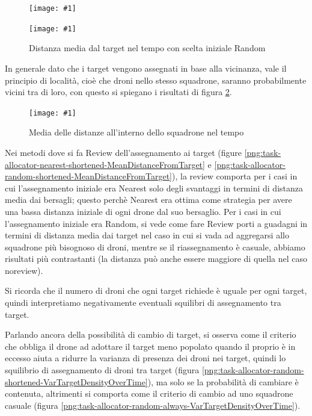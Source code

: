 \documentclass[a4paper,11pt,oneside, table]{article}
\newcommand{\putimage}[4] {
	\begin{figure}[H]
	    \centering
	    \texttt{[image: \#1]}
	    \caption{#2}\label{#3}
	\end{figure}
}
\newcommand{\putsubimage}[5] {
  \begin{minipage}{{#4}\linewidth}
	    \centering
      \texttt{[image: \#1]}
	    \caption{#2}\label{#3}
	\end{minipage}
}
\newcommand{\putimagecouple}[2] {
  \begin{figure}[!htb]
      \centering
      #1
      \hspace{0.5cm}
      #2
  \end{figure}
}
\begin{document}
\putimagecouple
{\putsubimage{images/experiments/task-allocator-nearest/MeanDistanceFromTarget.png}{Distanza media dal target nel tempo con scelta iniziale Nearest}{png:task-allocator-nearest-MeanDistanceFromTarget}{0.4}{0.99}}
{\putsubimage{images/experiments/task-allocator-random/MeanDistanceFromTarget.png}{Distanza media dal target nel tempo con scelta iniziale Random}{png:task-allocator-random-MeanDistanceFromTarget}{0.4}{0.99}}

In generale dato che i target vengono assegnati in base alla vicinanza, vale il principio di localit\`a, cio\`e che droni nello stesso squadrone, saranno probabilmente vicini tra di loro, con questo si spiegano i risultati di figura \ref{png:task-allocator-no-review-MeanDistancesWithinSquadron}.

\putimage{images/experiments/task-allocator-no-review/MeanDistancesWithinSquadron.png}{Media delle distanze all'interno dello squadrone nel tempo}{png:task-allocator-no-review-MeanDistancesWithinSquadron}{0.80}

Nei metodi dove si fa Review dell'assegnamento ai target (figure \ref{png:task-allocator-nearest-shortened-MeanDistanceFromTarget} e \ref{png:task-allocator-random-shortened-MeanDistanceFromTarget}), la review comporta per i casi in cui l'assegnamento iniziale era Nearest solo degli svantaggi in termini di distanza media dai bersagli; questo perch\`e Nearest era ottima come strategia per avere una bassa distanza iniziale di ogni drone dal suo bersaglio.
Per i casi in cui l'assegnamento iniziale era Random, si vede come fare Review porti a guadagni in termini di distanza media dai target nel caso in cui si vada ad aggregarsi allo squadrone pi\`u bisognoso di droni, mentre se il riassegnamento \`e casuale, abbiamo risultati pi\`u contrastanti (la distanza pu\`o anche essere maggiore di quella nel caso noreview).

Si ricorda che il numero di droni che ogni target richiede \`e uguale per ogni target, quindi interpretiamo negativamente eventuali squilibri di assegnamento tra target.

Parlando ancora della possibilit\`a di cambio di target, si osserva come il criterio che obbliga il drone ad adottare il target meno popolato quando il proprio \`e in eccesso aiuta a ridurre la varianza di presenza dei droni nei target, quindi lo squilibrio di assegnamento di droni tra target (figura \ref{png:task-allocator-random-shortened-VarTargetDensityOverTime}), ma solo se la probabilit\`a di cambiare \`e contenuta, altrimenti si comporta come il criterio di cambio ad uno squadrone casuale (figura \ref{png:task-allocator-random-always-VarTargetDensityOverTime}).
\end{document}
